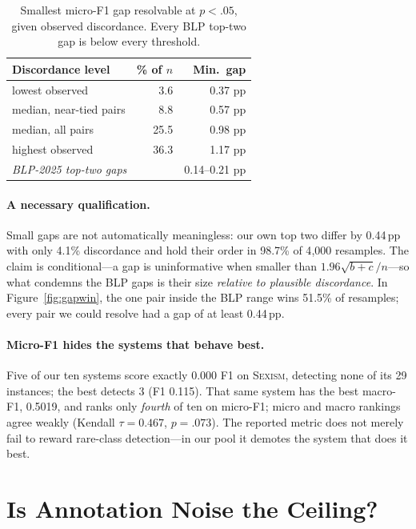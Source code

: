 \documentclass[11pt]{article}
\begin{document}
\begin{table}[h]
\centering\small
\begin{tabular}{lrr}
\toprule
Discordance level & \% of $n$ & Min.\ gap \\
\midrule
lowest observed & 3.6 & 0.37 pp \\
median, near-tied pairs & 8.8 & 0.57 pp \\
median, all pairs & 25.5 & 0.98 pp \\
highest observed & 36.3 & 1.17 pp \\
\midrule
\multicolumn{2}{l}{\emph{BLP-2025 top-two gaps}} & 0.14--0.21 pp \\
\bottomrule
\end{tabular}
\caption{Smallest micro-F1 gap resolvable at $p<.05$, given observed
discordance. Every BLP top-two gap is below every threshold.}
\label{tab:mdd}
\end{table}

\paragraph{A necessary qualification.} Small gaps are not automatically
meaningless: our own top two differ by 0.44\,pp with only 4.1\% discordance and
hold their order in 98.7\% of 4{,}000 resamples. The claim is conditional---a gap
is uninformative when smaller than $1.96\sqrt{b+c}/n$---so what condemns the BLP
gaps is their size \emph{relative to plausible discordance}. In
Figure~\ref{fig:gapwin}, the one pair inside the BLP range wins 51.5\% of
resamples; every pair we could resolve had a gap of at least 0.44\,pp.

\paragraph{Micro-F1 hides the systems that behave best.} Five of our ten systems
score exactly $0.000$ F1 on \textsc{Sexism}, detecting none of its 29 instances;
the best detects 3 (F1 0.115). That same system has the best macro-F1, 0.5019,
and ranks only \emph{fourth} of ten on micro-F1; micro and macro rankings agree
weakly (Kendall $\tau=0.467$, $p=.073$). The reported metric does not merely fail
to reward rare-class detection---in our pool it demotes the system that does it
best.

\section{Is Annotation Noise the Ceiling?}
\label{sec:ceiling}
\end{document}
